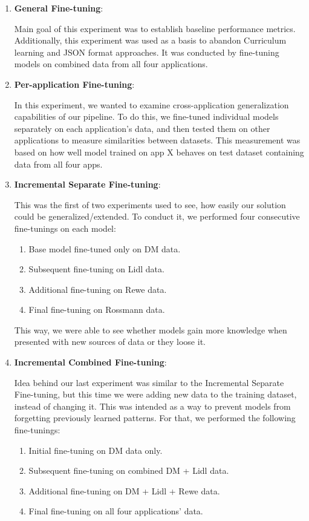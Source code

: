 \documentclass[licencjacka,en]{pracamgr}
\begin{document}
\begin{enumerate}
    \item \textbf{General Fine-tuning}:

    Main goal of this experiment was to establish baseline performance metrics. Additionally, this experiment was used as a basis to abandon
    Curriculum learning and JSON format approaches. It was conducted by fine-tuning models on combined data from all four applications.

    \item \textbf{Per-application Fine-tuning}:

    In this experiment, we wanted to examine cross-application generalization capabilities of our pipeline. To do this, we fine-tuned individual models separately on each application's data, and then tested them on other applications to measure similarities between datasets. This measurement was based on how well model trained on app X behaves on test dataset containing data from all four apps.

    \item \textbf{Incremental Separate Fine-tuning}:

    This was the first of two experiments used to see, how easily our solution could be generalized/extended. To conduct it, we performed four consecutive fine-tunings on each model:

    \begin{enumerate}
        \item Base model fine-tuned only on DM data.
        \item Subsequent fine-tuning on Lidl data.
        \item Additional fine-tuning on Rewe data.
        \item Final fine-tuning on Rossmann data.
    \end{enumerate}
    This way, we were able to see whether models gain more knowledge when presented with new sources of data or they loose it.

    \item \textbf{Incremental Combined Fine-tuning}:

    Idea behind our last experiment was similar to the Incremental Separate Fine-tuning, but this time we were adding new data to the training dataset, instead of changing it. This was intended as a way to prevent models from forgetting previously learned patterns. For that, we performed the following fine-tunings:
    \begin{enumerate}
        \item Initial fine-tuning on DM data only.
        \item Subsequent fine-tuning on combined DM + Lidl data.
        \item Additional fine-tuning on DM + Lidl + Rewe data.
        \item Final fine-tuning on all four applications' data.
    \end{enumerate}
\end{enumerate}
\end{document}
